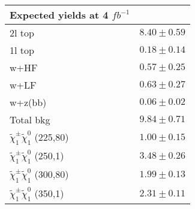 \begin{table}
\begin{center}
\begin{tabular}{lc}
Expected yields at 4 $fb^{-1}$ & \\
\hline
\hline
2l top&$8.40\pm0.59$\\
1l top&$0.18\pm0.14$\\
w+HF&$0.57\pm0.25$\\
w+LF&$0.63\pm0.27$\\
w+z(bb)&$0.06\pm0.02$\\
\hline
Total bkg&$9.84\pm0.71$\\
\hline
$\tilde{\chi}_{1}^{\pm}\tilde{\chi}_{1}^{0}$ (225,80)&$1.00\pm0.15$\\
$\tilde{\chi}_{1}^{\pm}\tilde{\chi}_{1}^{0}$ (250,1)&$3.48\pm0.26$\\
$\tilde{\chi}_{1}^{\pm}\tilde{\chi}_{1}^{0}$ (300,80)&$1.99\pm0.13$\\
$\tilde{\chi}_{1}^{\pm}\tilde{\chi}_{1}^{0}$ (350,1)&$2.31\pm0.11$\\
\hline
\hline
\end{tabular}
\end{center}
\end{table}
